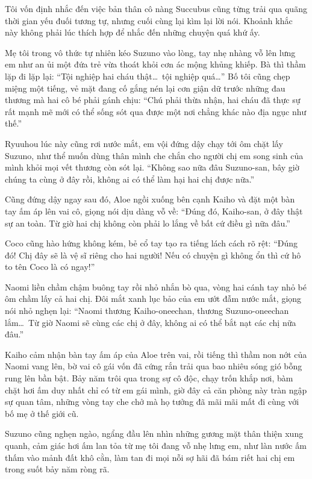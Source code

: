 ﻿\documentclass[../main.tex]{subfiles}
\begin{document}
Tôi vốn định nhắc đến việc bản thân cô nàng Succubus cũng từng trải qua quãng thời gian yếu đuối tương tự, nhưng cuối cùng lại kìm lại lời nói. Khoảnh khắc này không phải lúc thích hợp để nhắc đến những chuyện quá khứ ấy.

Mẹ tôi trong vô thức tự nhiên kéo Suzuno vào lòng, tay nhẹ nhàng vỗ lên lưng em như an ủi một đứa trẻ vừa thoát khỏi cơn ác mộng khủng khiếp. Bà thì thầm lặp đi lặp lại: ``Tội nghiệp hai cháu thật\dots\ tội nghiệp quá\dots'' Bố tôi cũng chẹp miệng một tiếng, vẻ mặt đang cố gắng nén lại cơn giận dữ trước những đau thương mà hai cô bé phải gánh chịu: ``Chú phải thừa nhận, hai cháu đã thực sự rất mạnh mẽ mới có thể sống sót qua được một nơi chẳng khác nào địa ngục như thế.''

Ryuuhou lúc này cũng rơi nước mắt, em vội đứng dậy chạy tới ôm chặt lấy Suzuno, như thể muốn dùng thân mình che chắn cho người chị em song sinh của mình khỏi mọi vết thương còn sót lại. ``Không sao nữa đâu Suzuno-san, bây giờ chúng ta cùng ở đây rồi, không ai có thể làm hại hai chị được nữa.''

Cũng đứng dậy ngay sau đó, Aloe ngồi xuống bên cạnh Kaiho và đặt một bàn tay ấm áp lên vai cô, giọng nói dịu dàng vỗ về: ``Đúng đó, Kaiho-san, ở đây thật sự an toàn. Từ giờ hai chị không còn phải lo lắng về bất cứ điều gì nữa đâu.''

Coco cũng hào hứng không kém, bẻ cổ tay tạo ra tiếng lách cách rõ rệt: ``Đúng đó! Chị đây sẽ là vệ sĩ riêng cho hai người! Nếu có chuyện gì không ổn thì cứ hô to tên Coco là có ngay!''

Naomi liền chầm chậm buông tay rồi nhỏ nhắn bò qua, vòng hai cánh tay nhỏ bé ôm chầm lấy cả hai chị. Đôi mắt xanh lục bảo của em ướt đẫm nước mắt, giọng nói nhỏ nghẹn lại: ``Naomi thương Kaiho-oneechan, thương Suzuno-oneechan lắm\dots\ Từ giờ Naomi sẽ cùng các chị ở đây, không ai có thể bắt nạt các chị nữa đâu.''

Kaiho cảm nhận bàn tay ấm áp của Aloe trên vai, rồi tiếng thì thầm non nớt của Naomi vang lên, bờ vai cô gái vốn đã cứng rắn trải qua bao nhiêu sóng gió bỗng rung lên bần bật. Bảy năm trôi qua trong sự cô độc, chạy trốn khắp nơi, bàm chặt hơi ấm duy nhất chỉ có từ em gái mình, giờ đây cả căn phòng này tràn ngập sự quan tâm, những vòng tay che chở mà họ tưởng đã mãi mãi mất đi cùng với bố mẹ ở thế giới cũ.

Suzuno cũng nghẹn ngào, ngẩng đầu lên nhìn những gương mặt thân thiện xung quanh, cảm giác hơi ấm lan tỏa từ mẹ tôi đang vỗ nhẹ lưng em, như làn nước ấm thấm vào mảnh đất khô cằn, làm tan đi mọi nỗi sợ hãi đã bám riết hai chị em trong suốt bảy năm ròng rã.
\end{document}
